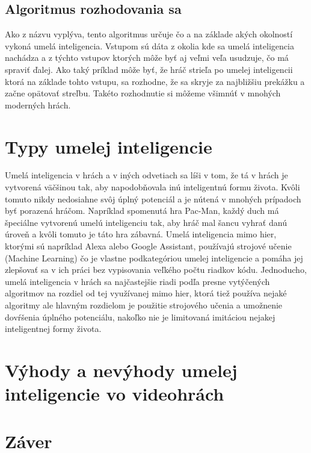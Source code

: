 \documentclass[10pt,oneside,slovak,a4paper]{article}
\begin{document}
\subsection{Algoritmus rozhodovania sa} \label{kapitola3.2}
Ako z názvu vyplýva, tento algoritmus určuje čo a na základe akých okolností vykoná umelá inteligencia. Vstupom sú dáta z okolia kde sa umelá inteligencia nachádza a z týchto vstupov ktorých môže byť aj veľmi veľa usudzuje, čo má spraviť ďalej. Ako taký príklad môže byť, že hráč strieľa po umelej inteligencii ktorá na základe tohto vstupu, sa rozhodne, že sa skryje za najbližšiu prekážku a začne opätovať streľbu. Takéto rozhodnutie si môžeme všimnúť v mnohých moderných hrách.


\section{Typy umelej inteligencie} \label{kapitola4}
Umelá inteligencia v hrách a v iných odvetiach sa líši v tom, že tá v hrách je vytvorená väčšinou tak, aby napodobňovala inú inteligentnú formu života. Kvôli tomuto nikdy nedosiahne svôj úplný potenciál a je nútená v mnohých prípadoch byť porazená hráčom. Napríklad spomenutá hra Pac-Man, každý duch má špeciálne vytvorenú umelú inteligenciu tak, aby hráč mal šancu vyhrať danú úroveň a kvôli tomuto je táto hra zábavná. Umelá inteligencia mimo hier, ktorými sú napríklad Alexa alebo Google Assistant, používajú strojové učenie (Machine Learning) čo je vlastne podkategóriou umelej inteligencie a pomáha jej zlepšovať sa v ich práci bez vypisovania veľkého počtu riadkov kódu. Jednoducho, umelá inteligencia v hrách sa najčastejšie riadi podľa presne vytýčených algoritmov na rozdiel od tej využívanej mimo hier, ktorá tiež používa nejaké algoritmy ale hlavným rozdielom je použitie strojového učenia a umožnenie dovŕšenia úplného potenciálu, nakoľko nie je limitovaná imitáciou nejakej inteligentnej formy života.


\section{Výhody a nevýhody umelej inteligencie vo videohrách} \label{kapitola5}


\section{Záver} \label{zaver} %






\end{document}
